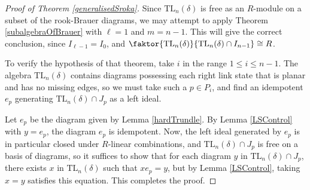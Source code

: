 \documentclass[12pt]{amsart}
\theoremstyle{plain}
\theoremstyle{definition} \newtheorem{definition}[theorem]{Definition}
\theoremstyle{plain}
\theoremstyle{plain} \newtheorem{proposition}[theorem]{Proposition}
\theoremstyle{plain} \newtheorem{conjecture}[theorem]{Conjecture}
\theoremstyle{plain} \newtheorem{corollary}[theorem]{Corollary}
\theoremstyle{remark} \newtheorem{claim}[theorem]{Claim}
\theoremstyle{remark} \newtheorem{remark}[theorem]{Remark}
\theoremstyle{remark} \newtheorem{example}[theorem]{Example}
\theoremstyle{remark} \newtheorem{comment}[theorem]{Comment}
\theoremstyle{definition} \newtheorem{question}[theorem]{Question}
\newcommand{\TL}{\mathrm{TL}}
\begin{document}
\begin{proof}[Proof of Theorem \ref{generalisedSroka}] Since $\TL_n(\delta)$ is free as an $R$-module on a subset of the rook-Brauer diagrams, we may attempt to apply Theorem \ref{subalgebraOfBrauer} with $\ell = 1$ and $m = n-1$. This will give the correct conclusion, since $I_{\ell-1}=I_0$, and $\faktor{\TL_n(\delta)}{\TL_n(\delta) \cap I_{n-1}} \cong R$.

To verify the hypothesis of that theorem, take $i$ in the range $1 \leq i \leq n-1$. The algebra $\TL_n(\delta)$ contains diagrams possessing each right link state that is planar and has no missing edges, so we must take such a $p \in P_i$, and find an idempotent $e_p$ generating $\TL_n(\delta) \cap J_p$ as a left ideal.

Let $e_p$ be the diagram given by Lemma \ref{hardTrundle}. By Lemma \ref{LSControl} with $y=e_p$, the diagram $e_p$ is idempotent. Now, the left ideal generated by $e_p$ is in particular closed under $R$-linear combinations, and $\TL_n(\delta) \cap J_p$ is free on a basis of diagrams, so it suffices to show that for each diagram $y$ in $\TL_n(\delta) \cap J_p$, there exists $x$ in $\TL_n(\delta)$ such that $x e_p = y$, but by Lemma \ref{LSControl}, taking $x=y$ satisfies this equation. This completes the proof. \end{proof}

\printbibliography
\end{document}
